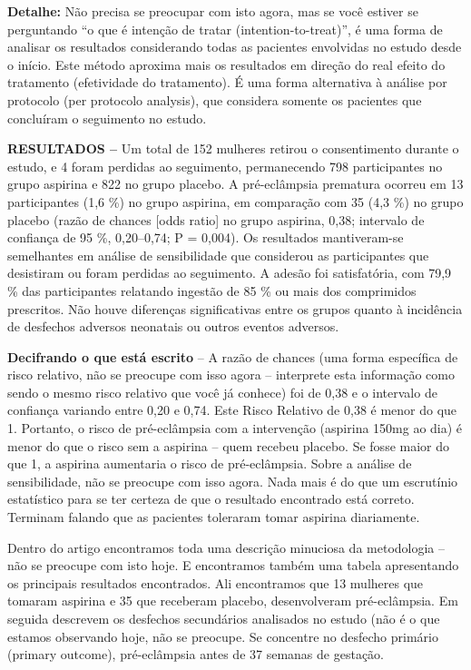 \documentclass[
  letterpaper,
  DIV=11,
  numbers=noendperiod]{scrreprt}
\begin{document}
\textbf{Detalhe:} Não precisa se preocupar com isto agora, mas se você
estiver se perguntando ``o que é intenção de tratar
(intention-to-treat)'', é uma forma de analisar os resultados
considerando todas as pacientes envolvidas no estudo desde o início.
Este método aproxima mais os resultados em direção do real efeito do
tratamento (efetividade do tratamento). É uma forma alternativa à
análise por protocolo (per protocolo analysis), que considera somente os
pacientes que concluíram o seguimento no estudo.

\textbf{RESULTADOS --} Um total de 152 mulheres retirou o consentimento
durante o estudo, e 4 foram perdidas ao seguimento, permanecendo 798
participantes no grupo aspirina e 822 no grupo placebo. A pré-eclâmpsia
prematura ocorreu em 13 participantes (1,6 \%) no grupo aspirina, em
comparação com 35 (4,3 \%) no grupo placebo (razão de chances {[}odds
ratio{]} no grupo aspirina, 0,38; intervalo de confiança de 95 \%,
0,20--0,74; P = 0,004). Os resultados mantiveram-se semelhantes em
análise de sensibilidade que considerou as participantes que desistiram
ou foram perdidas ao seguimento. A adesão foi satisfatória, com 79,9 \%
das participantes relatando ingestão de 85 \% ou mais dos comprimidos
prescritos. Não houve diferenças significativas entre os grupos quanto à
incidência de desfechos adversos neonatais ou outros eventos adversos.

\textbf{Decifrando o que está escrito} -- A razão de chances (uma forma
específica de risco relativo, não se preocupe com isso agora --
interprete esta informação como sendo o mesmo risco relativo que você já
conhece) foi de 0,38 e o intervalo de confiança variando entre 0,20 e
0,74. Este Risco Relativo de 0,38 é menor do que 1. Portanto, o risco de
pré-eclâmpsia com a intervenção (aspirina 150mg ao dia) é menor do que o
risco sem a aspirina -- quem recebeu placebo. Se fosse maior do que 1, a
aspirina aumentaria o risco de pré-eclâmpsia. Sobre a análise de
sensibilidade, não se preocupe com isso agora. Nada mais é do que um
escrutínio estatístico para se ter certeza de que o resultado encontrado
está correto. Terminam falando que as pacientes toleraram tomar aspirina
diariamente. ~

Dentro do artigo encontramos toda uma descrição minuciosa da metodologia
-- não se preocupe com isto hoje. E encontramos também uma tabela
apresentando os principais resultados encontrados. Ali encontramos que
13 mulheres que tomaram aspirina e 35 que receberam placebo,
desenvolveram pré-eclâmpsia. Em seguida descrevem os desfechos
secundários analisados no estudo (não é o que estamos observando hoje,
não se preocupe. Se concentre no desfecho primário (primary outcome),
pré-eclâmpsia antes de 37 semanas de gestação.
\end{document}
